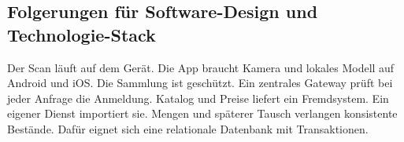 \subsection{Folgerungen für Software-Design und Technologie-Stack}
Der Scan läuft auf dem Gerät. Die App braucht Kamera und lokales Modell auf Android und iOS. Die Sammlung ist geschützt. Ein zentrales Gateway prüft bei jeder Anfrage die Anmeldung. Katalog und Preise liefert ein Fremdsystem. Ein eigener Dienst importiert sie. Mengen und späterer Tausch verlangen konsistente Bestände. Dafür eignet sich eine relationale Datenbank mit Transaktionen.
